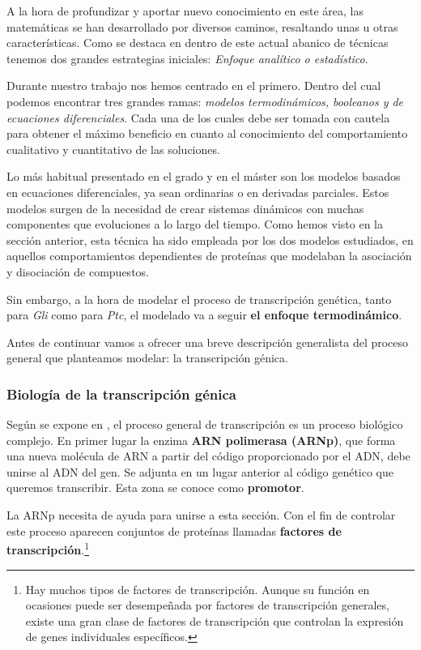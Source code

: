   A la hora de profundizar y aportar nuevo conocimiento en este área, las matemáticas se han desarrollado por diversos caminos, resaltando unas u otras características. Como se destaca en \cite{ay2011mathematical} dentro de este actual abanico de técnicas tenemos dos grandes estrategias iniciales: \textit{Enfoque analítico o estadístico}. 
  
  Durante nuestro trabajo nos hemos centrado en el primero. Dentro del cual podemos encontrar tres grandes ramas: \textit{modelos termodinámicos, booleanos y de ecuaciones diferenciales}. Cada una de los cuales debe ser tomada con cautela para obtener el máximo beneficio en cuanto al conocimiento del comportamiento cualitativo y cuantitativo de las soluciones. 
 
 Lo más habitual presentado en el grado y en el máster son los modelos basados en ecuaciones diferenciales, ya sean ordinarias o en derivadas parciales. Estos modelos surgen de la necesidad de crear sistemas dinámicos con muchas componentes que evoluciones a lo largo del tiempo. Como hemos visto en la sección anterior, esta técnica ha sido empleada por los dos modelos estudiados, en aquellos comportamientos dependientes de proteínas que modelaban la asociación y disociación de compuestos.
 
 Sin embargo, a la hora de modelar el proceso de transcripción genética, tanto para \textit{Gli} como para \textit{Ptc}, el modelado va a seguir \textbf{el enfoque termodinámico}. 
 
 Antes de continuar vamos a ofrecer una breve descripción generalista del proceso general que planteamos modelar: la transcripción génica.
 
 \subsubsection{Biología de la transcripción génica}
 Según se expone en \cite{biologia}, el proceso general de transcripción es un proceso biológico complejo. En primer lugar la enzima \textbf{ARN polimerasa (ARNp)}, que forma una nueva molécula de ARN a partir del código proporcionado por el ADN, debe unirse al ADN del gen. Se adjunta en un lugar anterior al código genético que queremos transcribir. Esta zona se conoce como \textbf{promotor}.
 
 La ARNp necesita de ayuda para unirse a esta sección. Con el fin de controlar este proceso aparecen conjuntos de proteínas llamadas \textbf{factores de transcripción}.\footnote{Hay muchos tipos de factores de transcripción. Aunque su función en ocasiones puede ser desempeñada por factores de transcripción generales, existe una gran clase de factores de transcripción que controlan la expresión de genes individuales específicos.}
 
